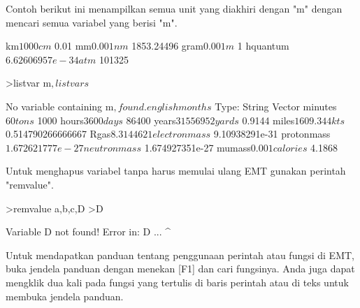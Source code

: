 \documentclass[a4paper,10pt]{article}
\begin{document}
\begin{eulernotebook}
\begin{eulercomment}
Contoh berikut ini menampilkan semua unit yang diakhiri dengan "m"
dengan mencari semua variabel yang berisi "m\textdollar{}".
\end{eulercomment}
\begin{euleroutput}
  km$                 1000
  cm$                 0.01
  mm$                 0.001
  nm$                 1853.24496
  gram$               0.001
  m$                  1
  hquantum$           6.62606957e-34
  atm$                101325
\end{euleroutput}
\begin{eulerprompt}
>listvar m$, listvar s$
\end{eulerprompt}
\begin{euleroutput}
  No variable containing m$, found.
  englishmonths$      Type: String Vector
  minutes$            60
  tons$               1000
  hours$              3600
  days$               86400
  years$              31556952
  yards$              0.9144
  miles$              1609.344
  kts$                0.514790266666667
  Rgas$               8.3144621
  electronmass$       9.10938291e-31
  protonmass$         1.672621777e-27
  neutronmass$        1.674927351e-27
  mumass$             0.001
  calories$           4.1868
\end{euleroutput}
\begin{eulercomment}
Untuk menghapus variabel tanpa harus memulai ulang EMT gunakan
perintah "remvalue".
\end{eulercomment}
\begin{eulerprompt}
>remvalue a,b,c,D
>D
\end{eulerprompt}
\begin{euleroutput}
  Variable D not found!
  Error in:
  D ...
   ^
\end{euleroutput}
\begin{eulercomment}
Untuk mendapatkan panduan tentang penggunaan perintah atau fungsi di
EMT, buka jendela panduan dengan menekan [F1] dan cari fungsinya. Anda
juga dapat mengklik dua kali pada fungsi yang tertulis di baris
perintah atau di teks untuk membuka jendela panduan.


\end{eulercomment}
\end{eulernotebook}
\end{document}
